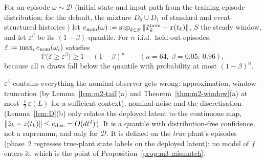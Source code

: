 \begin{definition}\label{def:m3-fit}
For an episode $\omega\sim\mathcal D$ (initial state and input path from the training episode
distribution; for the default, the mixture $D_0\cup D_1$ of standard and event-structured histories ) let $e_{\rm nom}(\omega):=\sup_{k\in S}\|\hat x^{\rm nom}_k-x(t_k)\|$, $S$ the steady
window, and let $\varepsilon^\beta$ be its $(1-\beta)$-quantile. For $n$ i.i.d.\ held-out episodes,
$\hat\varepsilon:=\max_ie_{\rm nom}(\omega_i)$ satisfies
\begin{equation}\label{eq:m3-quantile}
\mathbb P\big(\hat\varepsilon\ge\varepsilon^\beta\big)\ge1-(1-\beta)^n\qquad(n=64,\ \beta=0.05:\ 0.96),
\end{equation}
because all $n$ draws fall below the quantile with probability at most $(1-\beta)^n$.
\end{definition}

$\varepsilon^\beta$ contains everything the nominal observer gets wrong: approximation, window
truncation (by Lemma~\ref{lem:m2-tail}(a) and Theorem~\ref{thm:m2-window}(a) at most $\tfrac{\ell}{2}\varepsilon(L)$
for a sufficient context), nominal noise and the discretisation (Lemma~\ref{lem:D}(b) only relates the
deployed latent to the continuous map, $\|\bar z_k-z(t_k)\|\le e_{\rm disc}=O(dt^2)$). It is a
quantile with distribution-free confidence, not a supremum, and only for $\mathcal D$. It is defined on the
\emph{true} plant's episodes (phase~2 regresses true-plant state labels on the deployed latent): no model of $f$
enters it, which is the point of Proposition~\ref{prop:m3-mismatch}.


